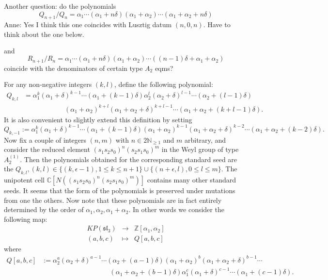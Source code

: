 \documentclass[11pt]{article}
\begin{document}
Another question: do the polynomials 
$$Q_{n+1} / Q_n = \alpha_1 \cdots (\alpha_1 + n \delta)(\alpha_1 + \alpha_2) \cdots (\alpha_1 + \alpha_2 + n \delta)$$
{\color{blue}Anne: Yes I think this one coincides with Lusztig datum $(n,0,n)$. Have to think about the one below.}

and 
$$R_{n+1} / R_n =   \alpha_1 \cdots  (\alpha_1 + n \delta)(\alpha_1 + \alpha_2) \cdots ((n-1) \delta + \alpha_1 + \alpha_2) $$
coincide with the denominators of certain type $A_2$ eqms? 

 \bigskip
 
  For any non-negative integers $(k,l)$, define the following  polynomial:
  \begin{align*}
   Q_{k,l} & = \alpha_1^k (\alpha_1 + \delta)^{k-1} \cdots (\alpha_1 + (k-1)\delta) \alpha_2^l (\alpha_2 + \delta)^{l-1} \cdots (\alpha_2 + (l-1)\delta) \\ & \qquad \qquad \qquad  (\alpha_1 + \alpha_2)^{k+l} (\alpha_1 + \alpha_2 + \delta)^{k+l-1} \cdots (\alpha_1 + \alpha_2 + (k+l-1)\delta) .  
     \end{align*}
  It is also convenient to slightly extend this definition by setting
  $$ Q_{k,-1} := \alpha_1^k (\alpha_1 + \delta)^{k-1} \cdots (\alpha_1 + (k-1)\delta) (\alpha_1 + \alpha_2)^{k-1} (\alpha_1 + \alpha_2 + \delta)^{k-2} \cdots (\alpha_1 + \alpha_2 + (k-2)\delta) . $$
Now fix a couple of integers $(n,m)$ with $n \in 2 \mathbb{N}_{\geq 1}$ and $m$ arbitrary, and consider the reduced element $(s_1s_2s_0)^n(s_2s_1s_0)^m$ in the Weyl group of type $A_2^{(1)}$. Then the polynomials obtained for the corresponding standard seed are the $Q_{k,l} , (k,l) \in \{(k, \epsilon - 1) , 1 \leq k \leq n+1 \} \cup \{ (n + \epsilon , l) , 0 \leq l \leq m \}$. 
The unipotent cell $\mathbb{C}[N((s_1s_2s_0)^n(s_2s_1s_0)^m)]$ contains many other standard seeds. It seems that the form of the polynomials is preserved under mutations from one the others. Now note that these polynomials are in fact entirely determined by the order of $\alpha_1, \alpha_2, \alpha_1 + \alpha_2$. In other words we consider the following map:
$$
 \begin{array}{ccc}
      KP(\mathfrak{sl}_3) & \longrightarrow & \mathbb{Z}[\alpha_1, \alpha_2] \\
      (a,b,c) & \longmapsto & Q[a,b,c]
 \end{array}
$$
where
\begin{align*}
 Q[a,b,c] & :=  \alpha_2^a (\alpha_2 + \delta)^{a-1} \cdots (\alpha_2 + (a-1)\delta) (\alpha_1 + \alpha_2)^{b} (\alpha_1 + \alpha_2 + \delta)^{b-1} \cdots \\ &   \qquad  \qquad \qquad  \qquad \qquad  (\alpha_1 + \alpha_2 + (b-1)\delta) \alpha_1^c (\alpha_1 + \delta)^{c-1} \cdots (\alpha_1 + (c-1)\delta). 
 \end{align*}
\end{document}
